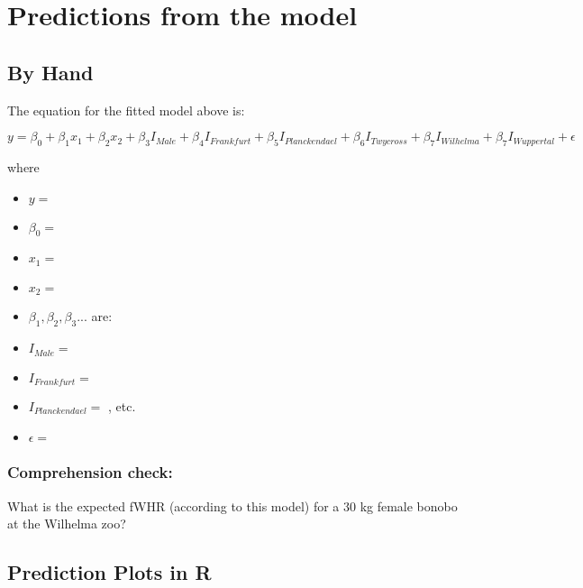 \documentclass[]{book}
\providecommand{\tightlist}{%
  \setlength{\itemsep}{0pt}\setlength{\parskip}{0pt}}
\begin{document}
\hypertarget{predictions-from-the-model}{%
\section{Predictions from the model}\label{predictions-from-the-model}}

\hypertarget{by-hand}{%
\subsection{By Hand}\label{by-hand}}

The equation for the fitted model above is:

\[ y = \beta_0 + \beta_1x_1 + \beta_2x_2 + \beta_3I_{Male} + \beta_4I_{Frankfurt} + \beta_5I_{Planckendael} + \beta_6I_{Twycross} + \beta_7I_{Wilhelma} + \beta_7I_{Wuppertal} + \epsilon\]

where

\begin{itemize}
\tightlist
\item
  \(y =\)
\item
  \(\beta_0=\)
\end{itemize}

\vspace{0.25in}

\begin{itemize}
\tightlist
\item
  \(x_1=\)
\item
  \(x_2=\)
\item
  \(\beta_1, \beta_2, \beta_3 ...\) are:
\item
  \(I_{Male} =\)
\item
  \(I_{Frankfurt} =\)
\item
  \(I_{Planckendael} =\) \hspace{3in}, etc.
\item
  \(\epsilon=\)
\end{itemize}

\hypertarget{comprehension-check}{%
\subsubsection{Comprehension check:}\label{comprehension-check}}

What is the expected fWHR (according to this model) for a 30 kg female bonobo at the Wilhelma zoo?

\vspace{1.5in}

\hypertarget{prediction-plots-in-r}{%
\subsection{Prediction Plots in R}\label{prediction-plots-in-r}}
\end{document}
